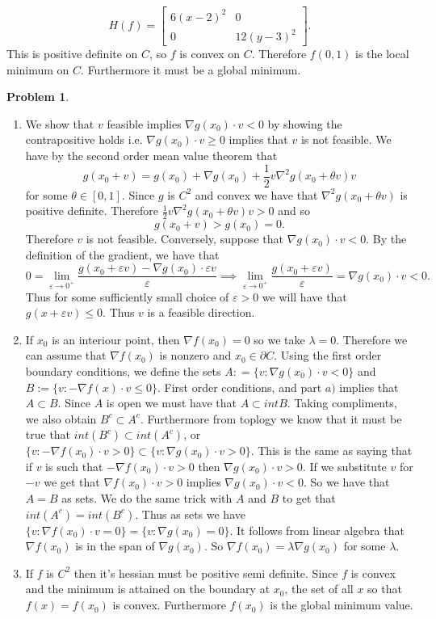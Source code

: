 \documentclass[12pt, a4paper]{article}
\newtheorem{problem}{Problem}
\theoremstyle{definition}
\newcommand{\penum}{ \begin{enumerate}[label=\bf(\alph*), leftmargin=0pt]}
\newcommand{\epenum}{ \end{enumerate} }
\newcommand{\bd}{\partial}
\newcommand{\grad}{\nabla}
\newcommand{\ep}{\varepsilon}
\newcommand{\bmat}[1]{\begin{bmatrix}#1\end{bmatrix}}
\begin{document}
$$H(f) = \bmat{6(x-2)^2 & 0 \\ 0 & 12(y-3)^2}.$$
This is positive definite on $C$, so $f$ is convex on $C$. Therefore $f(0,1)$ is the local minimum on $C$. Furthermore it must be a global minimum. 
\newpage
\begin{problem}
\end{problem}
\penum 
\item We show that $v$ feasible implies $\grad g(x_0) \cdot v<0$ by showing the contrapositive holds i.e. $\grad g(x_0)\cdot v \geq 0$ implies that $v$ is not feasible. We have by the second order mean value theorem that 
$$g(x_0 + v ) = g(x_0)  + \grad g(x_0) + \frac{1}{2} v \grad^2 g(x_0 + \theta v)v $$
 for some $\theta \in [0,1]$. Since $g$ is $C^2$ and convex we have that $\grad^2 g(x_0 + \theta v)$ is positive definite. Therefore $\frac{1}{2}v \grad^2 g(x_0 + \theta v) v >0$ and so 
 $$ g(x_0 + v ) > g(x_0) = 0.$$
 Therefore $v$ is not feasible. Conversely, suppose that $\grad g(x_0) \cdot v<0$. By the definition of the gradient, we have that 
 $$ 0 = \lim_{\ep \to 0^+} \frac{g(x_0 + \ep v)  - \grad g(x_0) \cdot \ep v}{\ep} \implies \lim_{\ep \to 0^+} \frac{g(x_0 + \ep v)}{\ep} = \grad g (x_0) \cdot v <0.$$
 Thus for some sufficiently small choice of $\ep>0$ we will have that $g(x + \ep v) \leq 0$. Thus $v$ is a feasible direction. 
 \item If $x_0$ is an interiour point, then $\grad f(x_0) = 0$ so we take $\lambda = 0$. Therefore we can assume that $\grad f(x_0)$ is nonzero and $x_0 \in \bd C$. Using the first order boundary conditions, we define the sets $A : = \{v: \grad g(x_0) \cdot v <0\}$ and $B:= \{v: -\grad f(x) \cdot v \leq 0\}$. First order conditions, and part $a)$ implies that $A \subset B$. Since $A$ is open we must have that $A \subset int B$. Taking compliments, we also obtain $B^c \subset A^c$. Furthermore from toplogy we know that it must be true that $int (B^c) \subset int(A^c)$, or $\{v : - \grad f(x_0) \cdot v >0\} \subset \{ v: \grad g(x_0) \cdot v >0\}$. This is the same as saying that if $v$ is such that $- \grad f(x_0) \cdot v >0$ then $\grad g(x_0) \cdot v >0$. If we substitute $v$ for $-v$ we get that $\grad f(x_0) \cdot v >0$ implies $\grad g(x_0) \cdot v <0$. So we have that $A= B$ as sets. We do the same trick with $A$ and $B$ to get that $int(A^c) = int(B^c)$. Thus as sets we have $\{v: \grad f(x_0) \cdot v = 0\} = \{v : \grad g(x_0) = 0\}$. It follows from linear algebra that $\grad f(x_0)$ is in the span of $\grad g(x_0)$. So $\grad f(x_0) = \lambda \grad g(x_0)$ for some $\lambda$.  
 \item If $f$ is $C^2$ then it's hessian must be positive semi definite. Since $f$ is convex and the minimum is attained on the boundary at $x_0$, the set of all $x$ so that $f(x) = f(x_0)$ is convex. Furthermore $f(x_0)$ is the global minimum value. 
\epenum
\end{document}
